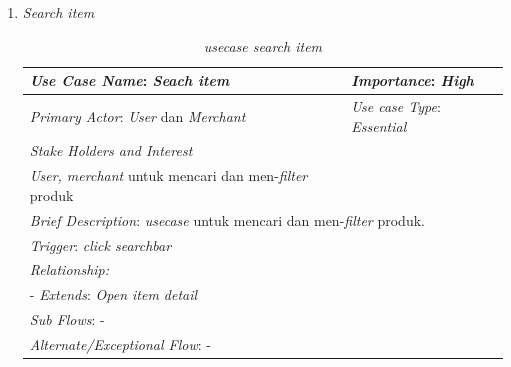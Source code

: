 \documentclass[a4paper]{article}
\begin{document}
\begin{enumerate}
\begin{enumerate}
        \newpage
        \item \textit{Search item}
            \begin{table}[h]
            \centering
            \begin{tabular}{|lll}
            \hline
            \multicolumn{1}{|l|}{\textit{Use Case Name}: \textit{Seach item}}             & \multicolumn{2}{l|}{\textit{Importance}: \textit{High}}   \\ \hline
            \multicolumn{1}{|l|}{\textit{Primary Actor}: \textit{User} dan \textit{Merchant}}             & \multicolumn{2}{l|}{\textit{Use case Type}: \textit{Essential}} \\ \hline
            \multicolumn{1}{|l|}{\textit{Stake Holders and Interest}} &                               &                               \\ \cline{1-1}
            \multicolumn{1}{|l|}{\textit{User, merchant} untuk mencari dan men-\textit{filter} produk}                                                     &                               &                               \\ \hline
            \multicolumn{3}{|l|}{\textit{Brief Description}: \textit{usecase} untuk mencari dan men-\textit{filter} produk.}                                                                         \\ \hline
            \multicolumn{3}{|l|}{\textit{Trigger}: \textit{click searchbar}}                                                                                   \\ \hline
            \multicolumn{3}{|l|}{\textit{Relationship:}}                                                                              \\ \hline
            \multicolumn{3}{|l|}{- \textit{Extends}: \textit{Open item detail}}                                                                                                                     \\ \hline
            \multicolumn{3}{|l|}{\textit{Sub Flows}: -}                                                                                 \\ \hline
            \multicolumn{3}{|l|}{\textit{Alternate/Exceptional Flow}: -}                                                                \\ \hline
            \end{tabular}
            \caption{\textit{usecase search item} }
            \end{table}


\end{enumerate}
\end{enumerate}
\end{document}
